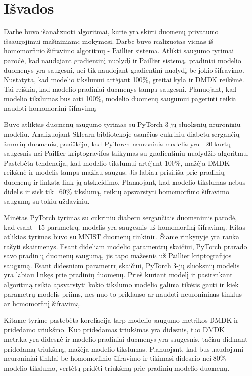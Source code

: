 \documentclass{VUMIFInfBakalaurinis}
\begin{document}
\section{Išvados}
\par Darbe buvo išanalizuoti algoritmai, kurie yra skirti duomenų privatumo išsaugojimui mašininiame mokymesi.  Darbe buvo realizuotas vienas iš homomorfinio šifravimo algoritmų - Paillier sistema. Atlikti saugumo tyrimai parodė, kad naudojant gradientinį nuolydį ir Paillier sistemą, pradiniai modelio duomenys yra saugesni, nei tik naudojant gradientinį nuolydį be jokio šifravimo. Nustatyta, kad modelio tikslumui artėjant 100\%, greitai kyla ir DMDK reikšmė. Tai reiškia, kad modelio pradiniai duomenys tampa saugesni. Planuojant, kad modelio tikslumas bus arti 100\%, modelio duomenų saugumui pagerinti reikia naudoti homomorfinį šifravimą.
\par Buvo atliktas duomenų saugumo tyrimas su PyTorch 3-jų sluoksnių neuroniniu modeliu. Analizuojant Sklearn bibliotekoje esančius cukriniu diabetu sergančių žmonių duomenis, paaiškėjo, kad PyTorch neuroninis modelis yra ~20 kartų saugesnis nei Paillier kriptogravifos taikymas su gradientiniu nuolydžio algoritmu. Pastebėta tendencija, kad modelio tikslumui artėjant 100\%, mažėja DMDK reikšmė ir modelis tampa mažiau saugus. Jis labiau prisiriša prie pradinių duomenų ir linksta link jų atskleidimo. Planuojant, kad modelio tikslumas nebus didelis ir siek tik ~60\% tikslumą, reiktų apsvarstyti homomorfinio šifravimo saugumą su tokiu uždaviniu.
\par Minėtas PyTorch tyrimas su cukriniu diabetu sergančiais duomenimis parodė, kad esant ~15 parametrų, modelis yra saugesnis už homomorfinį šifravimą. Kitas atliktas tyrimas buvo su MNIST duomenų rinkiniu. Šiame rinkynyje yra ranka rašyti skaitmenys. Esant dideliam modelio paramentrų skaičiui, PyTorch prarado savo pradinių duomenų saugumą, jis tapo mažesnis už Paillier kriptografijos saugumą. Esant didesniam parametrų skaičiui, PyTorch 3-jų sluoksnių modelis yra labiau linkęs  prie pradinių duomenų. Prieš kuriant modelį ir pasirenkant algoritmą reikia apsvarstyti kokio tikslumo modelio galima tikėtis gauti ir kiek parametrų modelis priims, nes nuo to priklauso ar naudoti neuronininus tinklus ar homomorfinį šifravimą.
\par Kitame tyrime pastebėta koreliacija tarp modelio saugumo metrikos DMDK ir pridedamo triukšmo. Kuo pridedamas triukšmas yra didesnis, tuo DMDK metrika yra didesnė ir modelio pradiniai duomenys yra saugesnis, tačiau didinant pridedamą triukšmą, mažėja modelio tikslumas. Planuojant, kad bus naudojami neuroniniai tinklai be homomorfinio šifravimo ir tikimasi didesnio nei 80\% modelio tikslumo, vertėtų pridėti triukšmą prie pradinių modelio duomenų.



\end{document}
